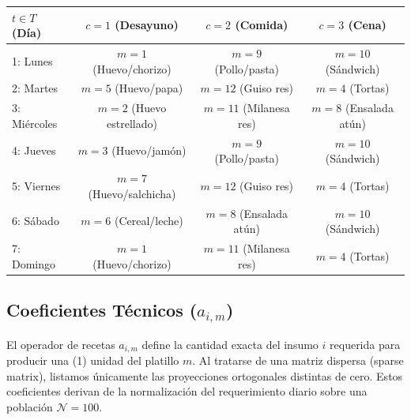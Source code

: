 \documentclass[12pt, a4paper]{article}
\begin{document}
\begin{longtable}{lccc}
\toprule
$t \in T$ (Día) & $c=1$ (Desayuno) & $c=2$ (Comida) & $c=3$ (Cena) \\
\midrule
1: Lunes & $m=1$ (Huevo/chorizo) & $m=9$ (Pollo/pasta) & $m=10$ (Sándwich) \\
2: Martes & $m=5$ (Huevo/papa) & $m=12$ (Guiso res) & $m=4$ (Tortas) \\
3: Miércoles & $m=2$ (Huevo estrellado) & $m=11$ (Milanesa res) & $m=8$ (Ensalada atún) \\
4: Jueves & $m=3$ (Huevo/jamón) & $m=9$ (Pollo/pasta) & $m=10$ (Sándwich) \\
5: Viernes & $m=7$ (Huevo/salchicha) & $m=12$ (Guiso res) & $m=4$ (Tortas) \\
6: Sábado & $m=6$ (Cereal/leche) & $m=8$ (Ensalada atún) & $m=10$ (Sándwich) \\
7: Domingo & $m=1$ (Huevo/chorizo) & $m=11$ (Milanesa res) & $m=4$ (Tortas) \\
\bottomrule
\end{longtable}

\subsection{Coeficientes Técnicos ($a_{i,m}$)}
El operador de recetas $a_{i,m}$ define la cantidad exacta del insumo $i$ requerida para producir una (1) unidad del platillo $m$. Al tratarse de una matriz dispersa (sparse matrix), listamos únicamente las proyecciones ortogonales distintas de cero. Estos coeficientes derivan de la normalización del requerimiento diario sobre una población $\mathcal{N} = 100$.
\end{document}
